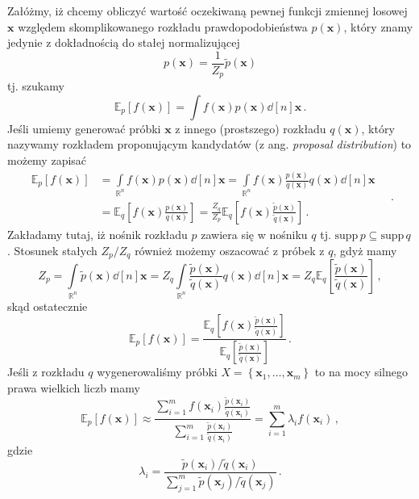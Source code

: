 \documentclass{myclass}
\begin{document}
Załóżmy, iż chcemy obliczyć wartość oczekiwaną pewnej funkcji zmiennej losowej \(\mathbf{x}\)
względem skomplikowanego rozkładu prawdopodobieństwa \(p(\mathbf{x})\), który znamy jedynie z
dokładnością do stałej normalizującej
\begin{equation*}
    p(\mathbf{x}) = \frac{1}{Z_p}\tilde{p}(\mathbf{x})
\end{equation*}
tj. szukamy
\begin{equation*}
    \mathbb{E}_p[f(\mathbf{x})] = \int f(\mathbf{x}) p(\mathbf{x})\dd[n]\mathbf{x}\,.
\end{equation*}
Jeśli umiemy generować próbki \(\mathbf{x}\) z innego (prostszego) rozkładu \(q(\mathbf{x})\), który
nazywamy rozkładem proponującym kandydatów (z ang. \textit{proposal distribution}) to możemy zapisać
\begin{equation*}
    \begin{split}
        \mathbb{E}_p[f(\mathbf{x})] &= \int\limits_{\mathbb{R}^n}f(\mathbf{x})p(\mathbf{x})\dd[n]\mathbf{x} = \int\limits_{\mathbb{R}^n}f(\mathbf{x})\frac{p(\mathbf{x})}{q(\mathbf{x})}q(\mathbf{x})\dd[n]\mathbf{x}\\
         &=\mathbb{E}_q\left[f(\mathbf{x}) \frac{p(\mathbf{x})}{q(\mathbf{x})}\right] = \frac{Z_q}{Z_p}\mathbb{E}_q\left[f(\mathbf{x}) \frac{\tilde{p}(\mathbf{x})}{\tilde{q}(\mathbf{x})}\right]\,.
    \end{split}\quad.
\end{equation*}
Zakładamy tutaj, iż nośnik rozkładu \(p\) zawiera się w nośniku \(q\) tj. \(\text{supp}\,p \subseteq
\text{supp}\,q\). Stosunek stałych \(Z_p / Z_q\) również możemy oszacować z próbek z \(q\), gdyż
mamy
\begin{equation*}
    Z_p = \int\limits_{\mathbb{R}^n}\tilde{p}(\mathbf{x})\dd[n]{\mathbf{x}} = Z_q\int\limits_{\mathbb{R}^n}\frac{\tilde{p}(\mathbf{x})}{\tilde{q}(\mathbf{x})} q(\mathbf{x})\dd[n]{\mathbf{x}} = Z_q \mathbb{E}_q\left[\frac{\tilde{p}(\mathbf{x})}{\tilde{q}(\mathbf{x})}\right]\,,
\end{equation*}
skąd ostatecznie
\begin{equation*}
    \mathbb{E}_p[f(\mathbf{x})] = \frac{\mathbb{E}_q\left[f(\mathbf{x}) \frac{\tilde{p}(\mathbf{x})}{\tilde{q}(\mathbf{x})}\right]}{\mathbb{E}_q\left[\frac{\tilde{p}(\mathbf{x})}{\tilde{q}(\mathbf{x})}\right]}\,.
\end{equation*}
Jeśli z rozkładu \(q\) wygenerowaliśmy próbki \(X =
\left\{\mathbf{x}_1,\ldots,\mathbf{x}_m\right\}\) to na mocy silnego prawa wielkich liczb mamy
\begin{equation*}
    \mathbb{E}_p[f(\mathbf{x})] \approx \frac{\sum_{i=1}^m f(\mathbf{x}_i) \frac{\tilde{p}(\mathbf{x}_i)}{\tilde{q}(\mathbf{x}_i)}}{\sum_{i=1}^m \frac{\tilde{p}(\mathbf{x}_i)}{\tilde{q}(\mathbf{x}_i)}} = \sum_{i=1}^m \lambda_i f(\mathbf{x}_i)\,,
\end{equation*}
gdzie
\begin{equation*}
    \lambda_i = \frac{\tilde{p}(\mathbf{x}_i) / \tilde{q}(\mathbf{x}_i)}{\sum_{j=1}^m \tilde{p}(\mathbf{x}_j) / \tilde{q}(\mathbf{x}_j) }\,.
\end{equation*}
\end{document}
